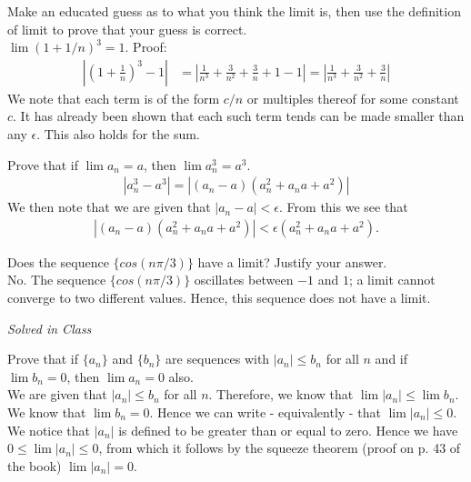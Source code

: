\documentclass[12pt]{book}
\newenvironment{exercise}[2][Exercise]{\begin{trivlist}
\item[\hskip \labelsep {\bfseries #1}\hskip \labelsep {\bfseries #2.}]}{\end{trivlist}}
\begin{document}
\begin{exercise}{2.2.6}
Make an educated guess as to what you think the limit is, then use the definition of limit to prove that your guess is correct.\\

$\lim (1 + 1/n)^3 = 1$. Proof:
	\begin{align*}
		| (1+ \frac{1}{n})^3 -1 | &= | \frac{1}{n^3} + \frac{3}{n^2}+ \frac{3}{n} + 1 - 1| = | \frac{1}{n^3} + \frac{3}{n^2}+ \frac{3}{n} |	
		\end{align*}
We note that each term is of the form $c/n$ or multiples thereof for some constant $c$. It has already been shown that each such term tends can be made smaller than any $\epsilon$. This also holds for the sum.
\end{exercise}


\begin{exercise}{2.2.8}
Prove that if $\lim a_n = a$, then $\lim a_n^3 = a^3$. 
	\begin{align*}
	|a_n^3 - a^3 | = |(a_n - a) (a_n^2 + a_n a + a^2)|
	\end{align*}
We then note that we are given that $|a_n - a| < \epsilon$. From this we see that 
	\begin{align*}
	|(a_n - a) (a_n^2 + a_n a + a^2)| < \epsilon (a_n^2 + a_n a + a^2).
	\end{align*}
\end{exercise}


\begin{exercise}{2.2.9}
Does the sequence $\{cos(n \pi /3)\}$ have a limit? Justify your answer. \\

No. The sequence $\{cos(n \pi /3)\}$ oscillates between $-1$ and $1$; a limit cannot converge to two different values. Hence, this sequence does not have a limit.
\end{exercise}

\begin{exercise}{2.2.10}
\emph{Solved in Class}
\end{exercise}

\begin{exercise}{2.2.11}
Prove that if $\{a_n\}$ and $\{b_n\}$ are sequences with $|a_n| \leq b_n$ for all $n$ and if $\lim b_n =0$, then $\lim a_n = 0$ also. \\

We are given that $ |a_n|  \leq b_n$ for all $n$. Therefore, we know that $ \lim |a_n| \leq \lim b_n$. We know that $\lim b_n = 0$. Hence we can write - equivalently - that $\lim |a_n| \leq 0$. We notice that $|a_n|$ is defined to be greater than or equal to zero. Hence we have $0 \leq \lim |a_n| \leq 0$, from which it follows by the squeeze theorem (proof on p. 43 of the book) $\lim |a_n| = 0$.
\end{exercise}
\end{document}
